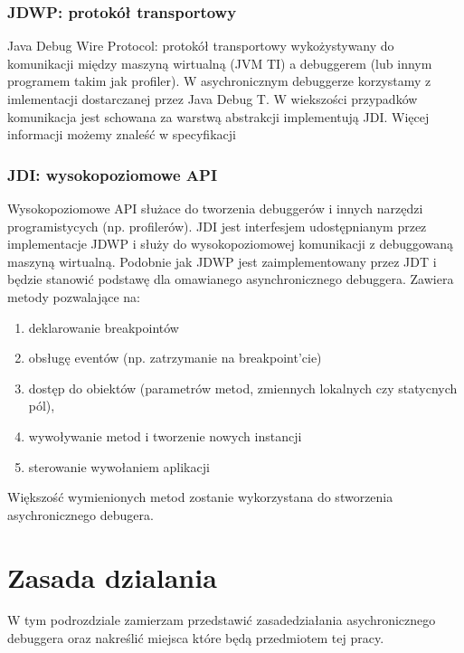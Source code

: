 \subsubsection{JDWP: protokół transportowy}

Java Debug Wire Protocol: protokół transportowy wykożystywany do komunikacji między maszyną wirtualną (JVM TI) a debuggerem (lub innym programem takim jak profiler). W asychronicznym debuggerze korzystamy z imlementacji dostarczanej przez Java Debug T. W wiekszości przypadków komunikacja jest schowana za warstwą abstrakcji implementują JDI. Więcej informacji możemy znaleść w specyfikacji\cite{jwdpSpec}

\subsubsection{JDI: wysokopoziomowe API}

Wysokopoziomowe API służace do tworzenia debuggerów i innych narzędzi programistycych (np. profilerów). JDI jest interfesjem udostępnianym przez implementacje JDWP i służy do wysokopoziomowej komunikacji z debuggowaną maszyną wirtualną. Podobnie jak JDWP jest zaimplementowany przez JDT i będzie stanowić podstawę dla omawianego asynchronicznego debuggera.
Zawiera metody pozwalające na: \begin{enumerate}
\item deklarowanie breakpointów
\item obsługę eventów (np. zatrzymanie na breakpoint'cie)
\item dostęp do obiektów (parametrów metod, zmiennych lokalnych czy statycnych pól),
\item wywoływanie metod i tworzenie nowych instancji
\item sterowanie wywołaniem aplikacji
\end{enumerate} Większość wymienionych metod zostanie wykorzystana do stworzenia asychronicznego debugera.





\section{Zasada dzialania}

W tym podrozdziale zamierzam przedstawić zasadedziałania asychronicznego debuggera oraz nakreślić  miejsca które będą przedmiotem tej pracy.

